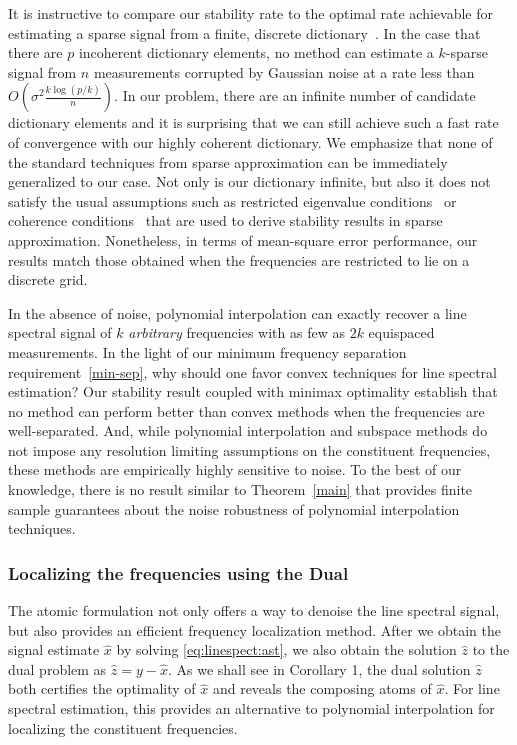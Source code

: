 It is instructive to compare our stability rate to the optimal rate achievable
for estimating a sparse signal from a finite, discrete
dictionary~\cite{cd_minimax}. In the case that there are $p$ incoherent
dictionary elements, no method can estimate a $k$-sparse signal from $n$
measurements corrupted by Gaussian noise at a rate less than $O(\sigma^2
\frac{k\log(p/k)}{n})$. In our problem, there are an infinite number of
candidate dictionary elements and it is surprising that we can still achieve
such a fast rate of convergence with our highly coherent dictionary. We
emphasize that none of the standard techniques from sparse approximation can be
immediately generalized to our case. Not only is our dictionary infinite, but
also it does not satisfy the usual assumptions such as restricted eigenvalue
conditions~\cite{rest_eig} or coherence conditions~\cite{coherence} that are
used to derive stability results in sparse approximation. Nonetheless, in terms
of mean-square error performance, our results match those obtained when the
frequencies are restricted to lie on a discrete grid.

In the absence of noise, polynomial interpolation can exactly recover a line
spectral signal of $k$ \emph{arbitrary} frequencies with as few as $2 k$
equispaced measurements. In the light of our minimum frequency separation
requirement~\eqref{min-sep}, why should one favor convex techniques for line
spectral estimation? Our stability result coupled with minimax optimality
establish that no method can perform better than convex methods when the
frequencies are well-separated. And, while polynomial interpolation and subspace
methods do not impose any resolution limiting assumptions on the constituent
frequencies, these methods are empirically highly sensitive to noise. To the
best of our knowledge, there is no result similar to Theorem~\ref{main} that
provides finite sample guarantees about the noise robustness of polynomial
interpolation techniques.


\subsubsection{Localizing the frequencies using the Dual} 

The atomic formulation not only offers a way to denoise the line spectral
signal, but also provides an efficient frequency localization method. After we
obtain the signal estimate $\hat{x}$ by solving \eqref{eq:linespect:ast}, we
also obtain the solution $\hat{z}$ to the dual problem as $\hat{z} = y -
\hat{x}$. As we shall see in Corollary 1, the dual solution $\hat{z}$ both
certifies the optimality of $\hat{x}$ and reveals the composing atoms of
$\hat{x}$. For line spectral estimation, this provides an alternative to
polynomial interpolation for localizing the constituent frequencies.

